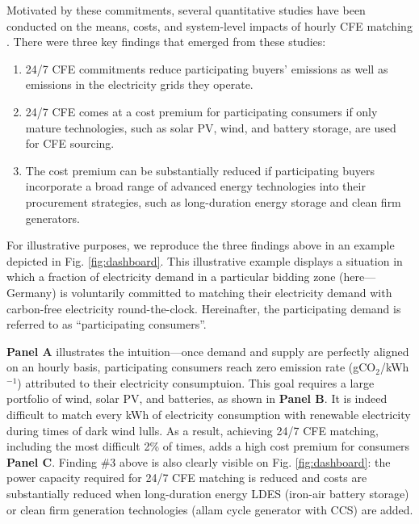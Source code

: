 \documentclass[pdflatex,sn-basic, Numbered]{sn-jnl}%
\theoremstyle{thmstyleone}%
\theoremstyle{thmstyletwo}%
\theoremstyle{thmstylethree}%
\begin{document}
Motivated by these commitments, several quantitative studies have been conducted on the means, costs, and system-level impacts of hourly CFE matching \cite{xu-247CFE-report, ieaAdvancingDecarbonisationClean2022, riepin-zenodo-systemlevel247, riepinMeansCostsSystemlevel2023}. There were three key findings that emerged from these studies: \\

\begin{enumerate}
    \item 24/7 CFE commitments reduce participating buyers' emissions as well as emissions in the electricity grids they operate.
    \item 24/7 CFE comes at a cost premium for participating consumers if only mature technologies, such as solar PV, wind, and battery storage, are used for CFE sourcing.
    \item The cost premium can be substantially reduced if participating buyers incorporate a broad range of advanced energy technologies into their procurement strategies, such as long-duration energy storage and clean firm generators.
\end{enumerate}

For illustrative purposes, we reproduce the three findings above in an example depicted in Fig. \ref{fig:dashboard}.
This illustrative example displays a situation in which a fraction of electricity demand in a particular bidding zone (here---Germany) is voluntarily committed to matching their electricity demand with carbon-free electricity round-the-clock.
Hereinafter, the participating demand is referred to as \enquote{participating consumers}.

\textbf{Panel A} illustrates the intuition---once demand and supply are perfectly aligned on an hourly basis, participating consumers reach zero emission rate (gCO$_2$/kWh$^{-1}$) attributed to their electricity consumptuion. This goal requires a large portfolio of wind, solar PV, and batteries, as shown in \textbf{Panel B}. It is indeed difficult to match every kWh of electricity consumption with renewable electricity during times of dark wind lulls. As a result, achieving 24/7 CFE matching, including the most difficult 2\% of times, adds a high cost premium for consumers \textbf{Panel C}. Finding \#3 above is also clearly visible on Fig. \ref{fig:dashboard}: the power capacity required for 24/7 CFE matching is reduced and costs are substantially reduced when long-duration energy LDES (iron-air battery storage) or clean firm generation technologies (allam cycle generator with CCS) are added.
\end{document}
